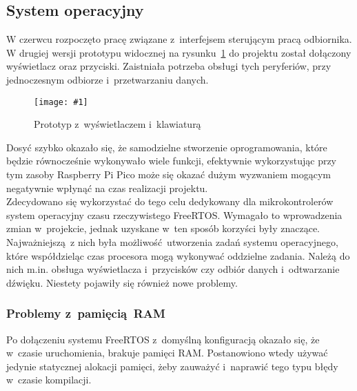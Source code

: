 \documentclass[polish]{aghengthesis}
\newcommand{\imgint}[4]{
	\begin{figure}[{#4}]
		\centering
		\texttt{[image: \#1]}
		\caption{#2}
		\label{#1}
	\end{figure}
}
\newcommand{\imgh}[3]{\imgint{#1}{#2}{#3}{H}}
\begin{document}
			
		\subsection{System operacyjny}
			W czerwcu rozpoczęto pracę związane z~interfejsem sterującym pracą odbiornika.
			W drugiej wersji prototypu widocznej na rysunku~\ref{4/prototype_2} do projektu został dołączony wyświetlacz oraz przyciski. Zaistniała potrzeba obsługi tych peryferiów, przy jednoczesnym odbiorze i~przetwarzaniu danych.
			
			\imgh{4/prototype_2}{Prototyp z~wyświetlaczem i~klawiaturą}{0.8}
			
			Dosyć szybko okazało się, że samodzielne stworzenie oprogramowania, które będzie równocześnie wykonywało wiele funkcji, efektywnie wykorzystując przy tym zasoby Raspberry Pi Pico może się okazać dużym wyzwaniem mogącym negatywnie wpłynąć na czas realizacji projektu.
			$ $\\
			
			Zdecydowano się wykorzystać do tego celu dedykowany dla mikrokontrolerów system operacyjny czasu rzeczywistego FreeRTOS. Wymagało to wprowadzenia zmian w~projekcie, jednak uzyskane w~ten sposób korzyści były znaczące.
			Najważniejszą z nich była możliwość utworzenia zadań systemu operacyjnego, które współdzieląc czas procesora mogą wykonywać oddzielne zadania.
			Należą do nich m.in. obsługa wyświetlacza i~przycisków czy odbiór danych i~odtwarzanie dźwięku.
			Niestety pojawiły się również nowe problemy.
			
			\subsubsection{Problemy z~pamięcią RAM}
				Po dołączeniu systemu FreeRTOS z~domyślną konfiguracją okazało się, że w~czasie uruchomienia, brakuje pamięci RAM.
				Postanowiono wtedy używać jedynie statycznej alokacji pamięci, żeby zauważyć i~naprawić tego typu błędy w~czasie kompilacji.
				$ $\\
\end{document}
